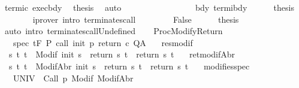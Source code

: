 \begin{isabellebody}
\ termi{\isacharunderscore}c\ exec{\isacharunderscore}bdy\ \isamarkupfalse%
\ {\isacharquery}thesis\ \isamarkupfalse%
\ auto\isanewline
\ \ \ \ \ \ \isamarkupfalse%
\isanewline
\ \ \ \ \isacommand{{\isacharbraceright}}\isamarkupfalse%
\isanewline
\ \ \ \ \isamarkupfalse%
\ bdy\ termi{\isacharunderscore}bdy\isanewline
\ \ \ \ \isamarkupfalse%
\ {\isacharquery}thesis\isanewline
\ \ \ \ \ \ \isamarkupfalse%
\ {\isacharparenleft}iprover\ intro{\isacharcolon}\ terminates{\isacharunderscore}call{\isacharparenright}\isanewline
\ \ \isamarkupfalse%
\isanewline
\ \ \ \ \isamarkupfalse%
\ False\isanewline
\ \ \ \ \isamarkupfalse%
\ {\isacharquery}thesis\isanewline
\ \ \ \ \ \ \isamarkupfalse%
\ {\isacharparenleft}auto\ intro{\isacharcolon}\ terminates{\isacharunderscore}callUndefined{\isacharparenright}\isanewline
\ \ \isamarkupfalse%
\isanewline
{}\isamarkupfalse%
%
\endisatagproof
{\isafoldproof}%
%
\isadelimproof
\isanewline
%
\endisadelimproof
\isanewline
{}\isamarkupfalse%
\ ProcModifyReturn{\isacharcolon}\isanewline
\ \ \ spec{\isacharcolon}\ {\isachardoublequoteopen}{\isasymGamma}{\isacharcomma}{\isasymTheta}{\isasymturnstile}\isactrlsub t\isactrlbsub {\isacharslash}F\isactrlesub \ P\ {\isacharparenleft}call\ init\ p\ return{\isacharprime}\ c{\isacharparenright}\ Q{\isacharcomma}A{\isachardoublequoteclose}\isanewline
\ \ \ res{\isacharunderscore}modif{\isacharcolon}\isanewline
\ \ {\isachardoublequoteopen}{\isasymforall}s\ t{\isachardot}\ t\ {\isasymin}\ Modif\ {\isacharparenleft}init\ s{\isacharparenright}\ {\isasymlongrightarrow}\ {\isacharparenleft}return{\isacharprime}\ s\ t{\isacharparenright}\ {\isacharequal}\ {\isacharparenleft}return\ s\ t{\isacharparenright}{\isachardoublequoteclose}\isanewline
\ \ \ ret{\isacharunderscore}modifAbr{\isacharcolon}\ \isanewline
\ \ {\isachardoublequoteopen}{\isasymforall}s\ t{\isachardot}\ t\ {\isasymin}\ ModifAbr\ {\isacharparenleft}init\ s{\isacharparenright}\ {\isasymlongrightarrow}\ {\isacharparenleft}return{\isacharprime}\ s\ t{\isacharparenright}\ {\isacharequal}\ {\isacharparenleft}return\ s\ t{\isacharparenright}{\isachardoublequoteclose}\isanewline
\ \ \ modifies{\isacharunderscore}spec{\isacharcolon}\ \ \ \ \isanewline
\ \ {\isachardoublequoteopen}{\isasymforall}{\isasymsigma}{\isachardot}\ {\isasymGamma}{\isacharcomma}{\isasymTheta}{\isasymturnstile}\isactrlbsub {\isacharslash}UNIV\isactrlesub \ {\isacharbraceleft}{\isasymsigma}{\isacharbraceright}\ {\isacharparenleft}Call\ p{\isacharparenright}\ {\isacharparenleft}Modif\ {\isasymsigma}{\isacharparenright}{\isacharcomma}{\isacharparenleft}ModifAbr\ {\isasymsigma}{\isacharparenright}{\isachardoublequoteclose}\isanewline

\end{isabellebody}
